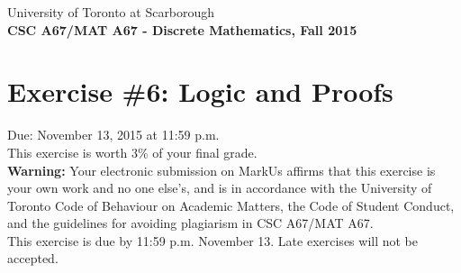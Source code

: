 \documentclass{article}
\begin{document}
{\large \noindent{}University of Toronto at Scarborough\\
\textbf{CSC A67/MAT A67 - Discrete Mathematics, Fall 2015}}

\section*{\huge Exercise \#6: Logic and Proofs}

{\large Due: November 13, 2015 at 11:59 p.m.\\
This exercise is worth 3\% of your final grade.}\\[1em]
\textbf{Warning:} Your electronic submission on MarkUs affirms that this exercise is your own work and no
one else's, and is in accordance with the University of Toronto Code of Behaviour on Academic Matters,
the Code of Student Conduct, and the guidelines for avoiding plagiarism in CSC A67/MAT A67.\\[1ex]
This exercise is due by 11:59 p.m. November 13. Late exercises will not be accepted.\\[1ex]
\renewcommand{\labelenumi}{\arabic{enumi}.}
\renewcommand{\labelenumii}{(\alph{enumii})}
\end{document}
